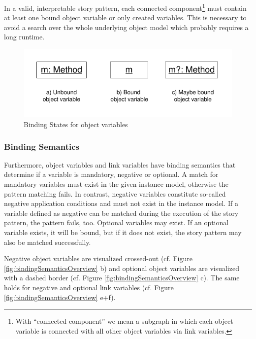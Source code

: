In a valid, interpretable story pattern, each connected component\footnote{With
``connected component'' we mean a subgraph in which each object variable is
connected with all other object variables via link variables.}
must contain at least one bound object variable or only created variables. This
is necessary to avoid a search over the whole underlying object model which probably requires a long runtime.


\begin{figure}[htbp]
  \centering
  \includegraphics[scale=1.2]{figures/BindingStatesOverview}
  \caption{Binding States for object variables}
  \label{fig:bindingStatesOverview}
\end{figure}

\subsubsection{Binding Semantics}
\label{sec:StoryPatterns:binding:semantics}
Furthermore, object variables and link variables have binding semantics that
determine if a variable is mandatory, negative or optional.
A match for mandatory variables must exist in the given instance model, otherwise
the pattern matching fails. 
In contrast, negative variables constitute so-called negative application
conditions and must not exist in the instance model. If a variable defined as
negative can be matched during the execution of the story pattern, the pattern
fails, too. Optional variables may exist. If an optional variable exists, it will be
bound, but if it does not exist, the story pattern may also be matched
successfully.

Negative object variables are visualized crossed-out (cf. Figure
\ref{fig:bindingSemanticsOverview} b) and optional object variables are
visualized with a dashed border (cf. Figure \ref{fig:bindingSemanticsOverview} c).
The same holds for negative and optional link variables (cf. Figure
\ref{fig:bindingSemanticsOverview} e+f).

